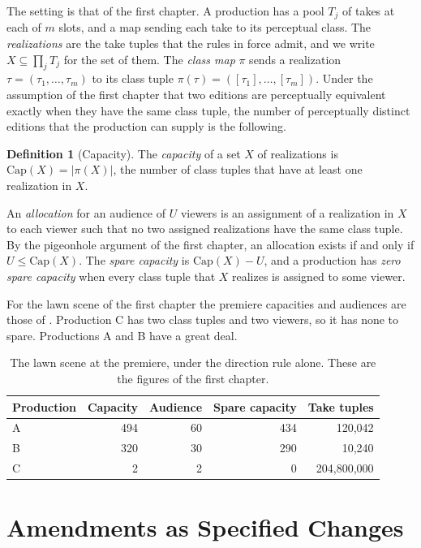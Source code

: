 \documentclass[11pt,twoside,openright]{book}
\theoremstyle{plain}
\theoremstyle{definition}
\newtheorem{definition}[theorem]{Definition}
\theoremstyle{remark}
\newcommand{\Capac}{\mathrm{Cap}}
\begin{document}
The setting is that of the first chapter. A production has a pool $T_j$ of takes at each of $m$ slots, and a map sending each take to its perceptual class. The \emph{realizations} are the take tuples that the rules in force admit, and we write $X\subseteq\prod_jT_j$ for the set of them. The \emph{class map} $\pi$ sends a realization $\tau=(\tau_1,\dots,\tau_m)$ to its class tuple $\pi(\tau)=([\tau_1],\dots,[\tau_m])$. Under the assumption of the first chapter that two editions are perceptually equivalent exactly when they have the same class tuple, the number of perceptually distinct editions that the production can supply is the following.

\begin{definition}[Capacity]\label{def:capacity}
The \emph{capacity} of a set $X$ of realizations is $\Capac(X)=\lvert\pi(X)\rvert$, the number of class tuples that have at least one realization in $X$.
\end{definition}

An \emph{allocation} for an audience of $U$ viewers is an assignment of a realization in $X$ to each viewer such that no two assigned realizations have the same class tuple. By the pigeonhole argument of the first chapter, an allocation exists if and only if $U\le\Capac(X)$. The \emph{spare capacity} is $\Capac(X)-U$, and a production has \emph{zero spare capacity} when every class tuple that $X$ realizes is assigned to some viewer.

For the lawn scene of the first chapter the premiere capacities and audiences are those of . Production C has two class tuples and two viewers, so it has none to spare. Productions A and B have a great deal.

\begin{table}[ht]
\centering
\begin{tabular}{@{}lrrrr@{}}
\toprule
Production & Capacity & Audience & Spare capacity & Take tuples\\
\midrule
A & 494 & 60 & 434 & 120,042\\
B & 320 & 30 & 290 & 10,240\\
C & 2 & 2 & 0 & 204,800,000\\
\bottomrule
\end{tabular}
\caption{The lawn scene at the premiere, under the direction rule alone. These are the figures of the first chapter.}\label{tab:premiere}
\end{table}

\section{Amendments as Specified Changes}\label{sec:amend}
\end{document}
